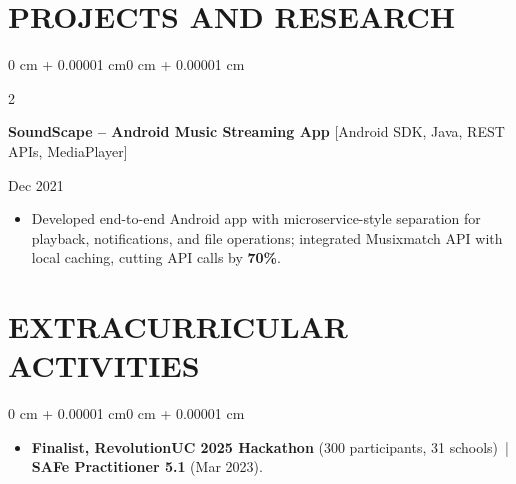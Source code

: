 \documentclass[10pt, letterpaper]{article}
\newenvironment{highlights}{
    \begin{itemize}[
        topsep=0.10 cm,
        parsep=0.06 cm,
        partopsep=0pt,
        itemsep=0.06 cm,
        leftmargin=12pt
    ]
}{
    \end{itemize}
}
\newenvironment{onecolentry}{
    \begin{adjustwidth}{0 cm + 0.00001 cm}{0 cm + 0.00001 cm}
}{
    \end{adjustwidth}
}
\newenvironment{twocolentry}[2][]{
    \onecolentry
    \def\secondColumn{#2}
    \setcolumnwidth{\fill, 4.5 cm}
    \begin{paracol}{2}
}{
    \switchcolumn \raggedleft \secondColumn
    \end{paracol}
    \endonecolentry
}
\begin{document}
\section{PROJECTS AND RESEARCH}
\begin{twocolentry}{Dec 2021}
\textbf{SoundScape -- Android Music Streaming App} [Android SDK, Java, REST APIs, MediaPlayer]
\end{twocolentry}
\begin{highlights}
  \item Developed end-to-end Android app with microservice-style separation for playback, notifications, and file operations; integrated Musixmatch API with local caching, cutting API calls by \textbf{70\%}.
\end{highlights}

\section{EXTRACURRICULAR ACTIVITIES}
\begin{onecolentry}
\begin{highlights}
  \item \textbf{Finalist, RevolutionUC 2025 Hackathon} (300 participants, 31 schools) \,|\, \textbf{SAFe Practitioner 5.1} (Mar 2023).
\end{highlights}
\end{onecolentry}
\end{document}
